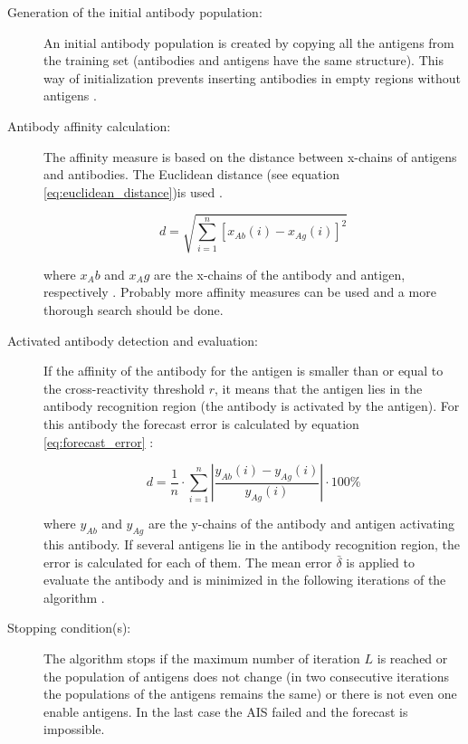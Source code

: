 \documentclass{assignment}
\begin{document}
\begin{description}
\item[Generation of the initial antibody population:] An initial antibody population is created by copying all the antigens from the training set (antibodies and antigens have the same structure). This way of initialization prevents inserting antibodies in empty regions without antigens \cite{AIS_STLF08}.

\item[Antibody affinity calculation:] The affinity measure is based on the distance between x-chains of antigens and antibodies. The Euclidean distance (see equation \eqref{eq:euclidean_distance})is used \cite{AIS_STLF08}.

\begin{equation}
d = \sqrt{\displaystyle\sum_{i=1}^{n} [x_{Ab}(i) - x_{Ag}(i)]^2}
\label{eq:euclidean_distance}
\end{equation}

where $x_Ab$ and $x_Ag$ are the x-chains of the antibody and antigen, respectively \cite{AIS_STLF08}. Probably more affinity measures can be used and a more thorough search should be done.

\item[Activated antibody detection and evaluation:]  If the affinity of the antibody for the antigen is smaller than or equal to the cross-reactivity threshold $r$, it means that the antigen lies in the antibody recognition region (the antibody is activated by the antigen). For this antibody the forecast error is calculated by equation \eqref{eq:forecast_error} \cite{AIS_STLF08}:

\begin{equation}
d = \frac{1}{n} \cdot \displaystyle\sum_{i=1}^{n} \left| \frac{y_{Ab}(i) - y_{Ag}(i)}{y_{Ag}(i)}\right| \cdot 100\%
\label{eq:forecast_error}
\end{equation}

where $y_{Ab}$ and $y_{Ag}$ are the y-chains of the antibody and antigen activating this antibody.
If several antigens lie in the antibody recognition region, the error is calculated for each of them. The mean error $\bar{\delta}$ is applied to evaluate the antibody and is minimized in the following iterations of the algorithm \cite{AIS_STLF08}.

\item[Stopping condition(s):]  The algorithm stops if the maximum number of iteration $L$  is reached \cite{AIS_STLF08} or the population of antigens does not change (in two consecutive iterations the populations of the antigens remains the same) or there is not even one enable antigens. In the last case the AIS failed and the forecast is impossible.


\end{description}
\end{document}
